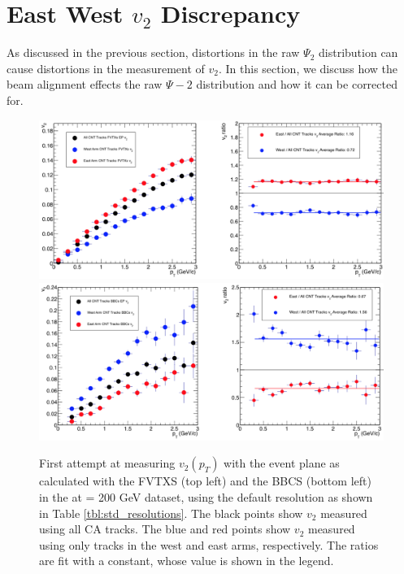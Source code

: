 \section{East West $v_2$ Discrepancy}
As discussed in the previous section, distortions in the raw $\Psi_2$ distribution can cause distortions in the measurement of $v_2$. In this section, we discuss how the beam alignment effects the raw $\Psi-2$ distribution and how it can be corrected for.
\begin{figure}[!h]
\centering
\includegraphics[width=0.85\linewidth]{figs/fvtxs_default_ew.png}
\includegraphics[width=0.85\linewidth]{figs/bbcs_default_ew.png}
\caption{First attempt at measuring $v_{2} (p_T)$ with the event plane as calculated with the FVTXS (top left) and the BBCS (bottom left) in the \pau at \sqsn = 200 GeV dataset, using the default resolution as shown in Table \ref{tbl:std_resolutions}. The black points show $v_2$ measured using all CA tracks. The blue and red points show $v_2$ measured using only tracks in the west and east arms, respectively. The ratios are fit with a constant, whose value is shown in the legend.}
\label{fig:fvtx_ew_default}
\end{figure}

